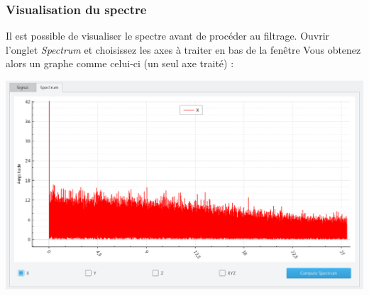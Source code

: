 \documentclass[a4paper,12pt]{article}
\begin{document}
\subsubsection{Visualisation du spectre}
Il est possible de visualiser le spectre avant de procéder au filtrage. 
Ouvrir l'onglet \emph{Spectrum} et choisissez les axes à traiter en bas de la fenêtre
Vous obtenez alors un graphe comme celui-ci (un seul axe traité) :
\begin{center}
 \includegraphics[width=17cm]{img/graphSpectrum.png}
\end{center}
\end{document}

